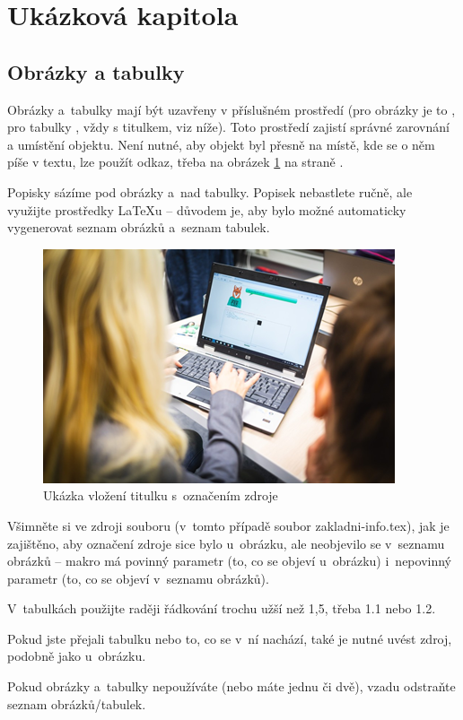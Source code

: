 \section{Ukázková kapitola}

\subsection{Obrázky a tabulky}


Obrázky a~tabulky mají být uzavřeny v příslušném prostředí (pro obrázky je to , pro tabulky , vždy s titulkem, viz níže). Toto prostředí zajistí správné zarovnání a umístění objektu. Není nutné, aby objekt byl přesně na místě, kde se o něm píše v textu, lze použít odkaz, třeba na obrázek \ref{fig:slecnasnotebookem} na straně \pageref{fig:slecnasnotebookem}.

Popisky sázíme pod obrázky a~nad tabulky. Popisek nebastlete ručně, ale využijte prostředky \LaTeX u -- důvodem je, aby bylo možné automaticky vygenerovat seznam obrázků a~seznam tabulek.

\begin{figure}[htb]
	\centering
		\includegraphics[width=.5\textwidth]{slecna-s-notebookem.png}
	\caption[Ukázka vložení titulku s~označením zdroje]{Ukázka vložení titulku s~označením zdroje\cite{mytyprog}}
	\label{fig:slecnasnotebookem}
\end{figure}


Všimněte si ve zdroji souboru (v~tomto případě soubor zakladni-info.tex), jak je zajištěno, aby označení zdroje sice bylo u~obrázku, ale neobjevilo se v~seznamu obrázků -- makro  má povinný parametr (to, co se objeví u~obrázku) i~nepovinný parametr (to, co se objeví v~seznamu obrázků).

V~tabulkách použijte raději řádkování trochu užší než 1,5, třeba 1.1 nebo 1.2.

Pokud jste přejali tabulku nebo to, co se v~ní nachází, také je nutné uvést zdroj, podobně jako u~obrázku.

Pokud obrázky a~tabulky nepoužíváte (nebo máte jednu či dvě), vzadu odstraňte seznam obrázků/tabulek.


